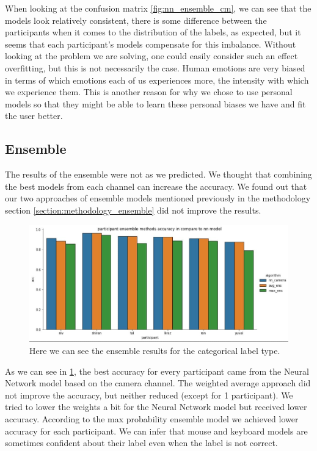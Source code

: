     When looking at the confusion matrix \ref{fig:nn_ensemble_cm}, we can see that the models look relatively consistent, 
    there is some difference between the participants when it comes to the distribution of the labels, 
    as expected, but it seems that each participant's models compensate for this imbalance. Without looking at the 
    problem we are solving, one could easily consider such an effect overfitting, but this is not necessarily the case. 
    Human emotions are very biased in terms of which emotions each of us experiences more, the intensity with which we experience them. 
    This is another reason for why we chose to use personal models so that they might be able to learn these personal biases we have and fit the user better.

    \newpage
    
    \subsection{Ensemble}

    The results of the ensemble were not as we predicted. We thought that combining the best models from each channel can increase the accuracy. 
    We found out that our two approaches of ensemble models mentioned previously in the methodology section \ref{section:methodology_ensemble} 
    did not improve the results. 

    \begin{figure}[!htp]
        \centering
        \includegraphics[width=14cm]{figures/results/categorical_ensemble}   
        \caption{Here we can see the ensemble results for the categorical label type.}
        \label{fig:categorical_ensemble} 
    \end{figure}

    As we can see in \ref{fig:categorical_ensemble}, the best accuracy for every participant came from the Neural Network model based on the camera channel. 
    The weighted average approach did not improve the accuracy, but neither reduced (except for 1 participant). 
    We tried to lower the weights a bit for the Neural Network model but received lower accuracy.
    According to the max probability ensemble model we achieved lower accuracy for each participant. 
    We can infer that mouse and keyboard models are sometimes confident about their label even when the label is not correct.

